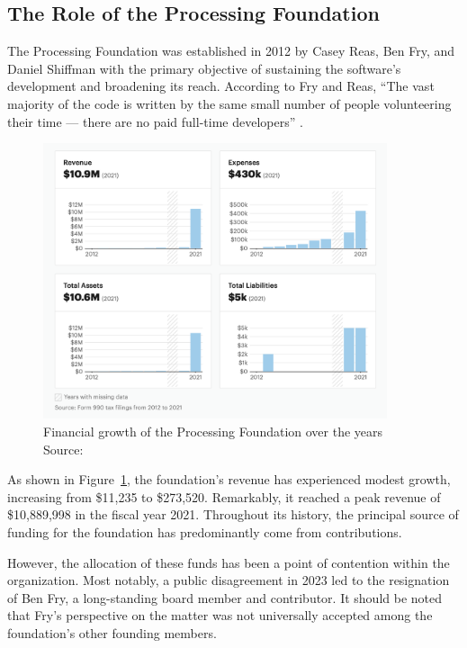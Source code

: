 \subsection{The Role of the Processing Foundation}

The Processing Foundation was established in 2012 by Casey Reas, Ben Fry, and Daniel Shiffman with the primary objective of sustaining the software's development and broadening its reach. According to Fry and Reas, ``The vast majority of the code is written by the same small number of people volunteering their time — there are no paid full-time developers'' \parencite[p.~13]{fryModernPrometheusHistory2018}.

\begin{figure}[h]
    \centering
    \includegraphics[width=0.9\textwidth]{images/foundation-finances.png} 
    \caption{Financial growth of the Processing Foundation over the years Source: \parencite{ProcessingFoundationNonprofit2013}}
    \label{fig:foundation-finances}
\end{figure}

As shown in Figure~\ref{fig:foundation-finances}, the foundation's revenue has experienced modest growth, increasing from \$11,235 to \$273,520. Remarkably, it reached a peak revenue of \$10,889,998 in the fiscal year 2021. Throughout its history, the principal source of funding for the foundation has predominantly come from contributions. 

However, the allocation of these funds has been a point of contention within the organization. Most notably, a public disagreement in 2023 led to the resignation of Ben Fry, a long-standing board member and contributor. It should be noted that Fry's perspective on the matter was not universally accepted among the foundation's other founding members. \parencite{benfry[@ben_fry]HaveMadeExtremely2023} \parencite{caseyreas[@reas]EarlierThisWeek2023} \parencite{danielshiffman[@shiffman]WouldPostNote2023}
